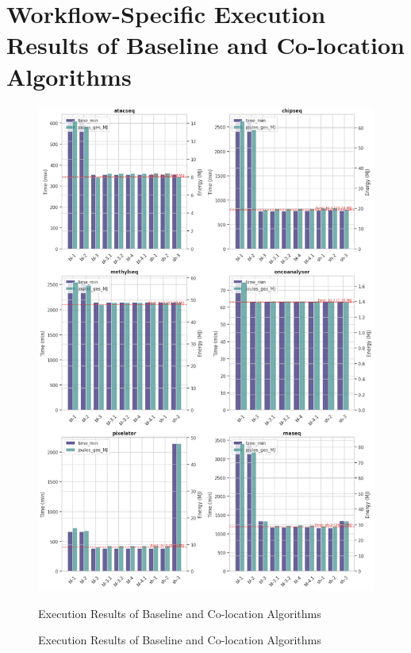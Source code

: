 \appendix
\label{sec:appendix}
\section{Workflow-Specific Execution Results of Baseline and Co-location Algorithms}
\begin{figure}[H]
    \centering
    \includegraphics[scale=0.8]{fig/09/09_appendiy_1.png}
    \small
    \caption{Execution Results of Baseline and Co-location Algorithms}
    \label{fig:09-rf}
    \tiny
    Execution Results of Baseline and Co-location Algorithms
\end{figure}
